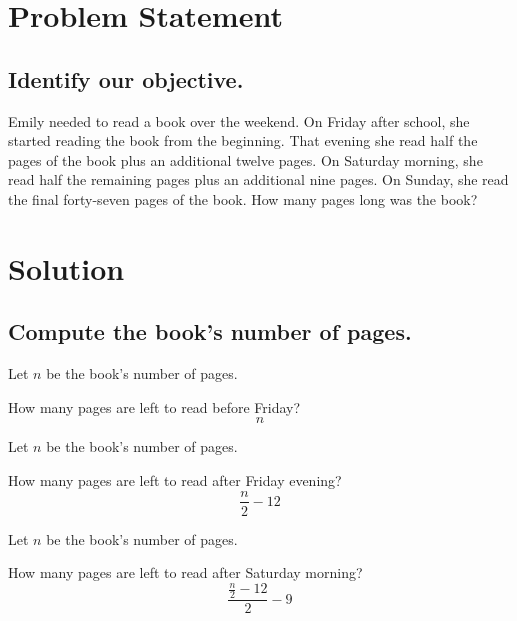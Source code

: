 \documentclass{beamer} %
\begin{document}
\begin{frame} %
  \titlepage
\end{frame}

\section{Problem Statement}

\subsection*{Identify our objective.}

\begin{frame}
Emily needed to read a book over the weekend. On Friday after school, she started reading the book from the beginning. That evening she read half the pages of the book plus an additional twelve pages. On Saturday morning, she read half the remaining pages plus an additional nine pages. On Sunday, she read the final forty-seven pages of the book. How many pages long was the book?
\end{frame}

\section{Solution}

\subsection*{Compute the book's number of pages.}

\begin{frame}
Let $n$ be the book's number of pages.

How many pages are left to read before Friday?
\[
n
\]
\end{frame}

\setcounter{equation}{0}

\begin{frame}
Let $n$ be the book's number of pages.

How many pages are left to read after Friday evening?
\[
\frac{n}{2}-12
\]
\end{frame}

\begin{frame}
Let $n$ be the book's number of pages.

How many pages are left to read after Saturday morning?
\[
\frac{\frac{n}{2}-12}{2}-9
\]
\end{frame}
\end{document}

